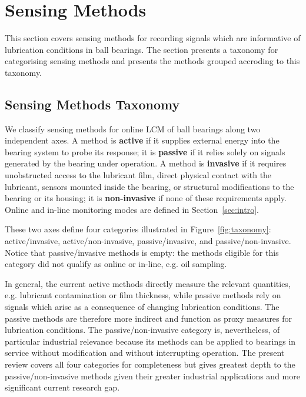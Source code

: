 \section{Sensing Methods}
\label{sec:sensing}
This section covers sensing methods for recording signals which are informative of lubrication conditions in ball bearings. The section presents a taxonomy for categorising sensing methods and presents the methods grouped accroding to this taxonomy.

\subsection{Sensing Methods Taxonomy}
We classify sensing methods for online LCM of ball bearings along two independent axes. A method is \textbf{active} if it supplies external energy into the bearing system to probe its response; it is \textbf{passive} if it relies solely on signals generated by the bearing under operation. A method is \textbf{invasive} if it requires unobstructed access to the lubricant film, direct physical contact with the lubricant, sensors mounted inside the bearing, or structural modifications to the bearing or its housing; it is \textbf{non-invasive} if none of these requirements apply. Online and in-line monitoring modes are defined in Section~\ref{sec:intro}.

These two axes define four categories illustrated in Figure~\ref{fig:taxonomy}: active/invasive, active/non-invasive, passive/invasive, and passive/non-invasive. Notice that passive/invasive methods is empty: the methods eligible for this category did not qualify as online or in-line, e.g. oil sampling.

In general, the current active methods directly measure the relevant quantities, e.g. lubricant contamination or film thickness, while passive methods rely on signals which arise as a consequence of changing lubrication conditions. The passive methods are therefore more indirect and function as proxy measures for lubrication conditions. The passive/non-invasive category is, nevertheless, of particular industrial relevance because its methods can be applied to bearings in service without modification and without interrupting operation. The present review covers all four categories for completeness but gives greatest depth to the passive/non-invasive methods given their greater industrial applications and more significant current research gap.

